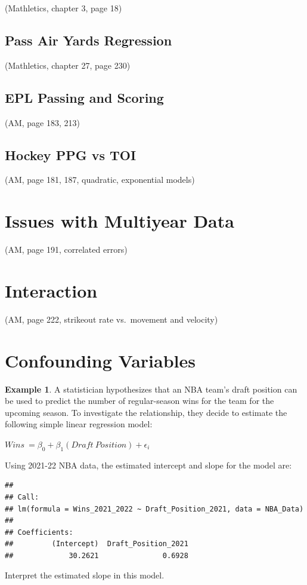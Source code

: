 \documentclass[
  11pt,
]{book}
\theoremstyle{definition}
\theoremstyle{definition}
\newtheorem{example}{Example}[chapter]
\theoremstyle{definition}
\theoremstyle{definition}
\theoremstyle{remark}
\begin{document}
(Mathletics, chapter 3, page 18)

\hypertarget{pass-air-yards-regression}{%
\subsection{Pass Air Yards Regression}\label{pass-air-yards-regression}}

(Mathletics, chapter 27, page 230)

\hypertarget{epl-passing-and-scoring}{%
\subsection{EPL Passing and Scoring}\label{epl-passing-and-scoring}}

(AM, page 183, 213)

\hypertarget{hockey-ppg-vs-toi}{%
\subsection{Hockey PPG vs TOI}\label{hockey-ppg-vs-toi}}

(AM, page 181, 187, quadratic, exponential models)

\hypertarget{issues-with-multiyear-data}{%
\section{Issues with Multiyear Data}\label{issues-with-multiyear-data}}

(AM, page 191, correlated errors)

\hypertarget{interaction}{%
\section{Interaction}\label{interaction}}

(AM, page 222, strikeout rate vs.~movement and velocity)

\hypertarget{confounding-variables}{%
\section{Confounding Variables}\label{confounding-variables}}

\begin{example}
A statistician hypothesizes that an NBA team's draft position can be used to predict the number of regular-season wins for the team for the upcoming season. To investigate the relationship, they decide to estimate the following simple linear regression model:

\(Wins\ = \beta_0 + \beta_1(Draft\ Position) + \epsilon_i\)

Using 2021-22 NBA data, the estimated intercept and slope for the model are:

\begin{verbatim}
## 
## Call:
## lm(formula = Wins_2021_2022 ~ Draft_Position_2021, data = NBA_Data)
## 
## Coefficients:
##         (Intercept)  Draft_Position_2021  
##             30.2621               0.6928
\end{verbatim}

Interpret the estimated slope in this model.
\end{example}
\end{document}
